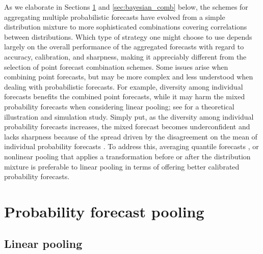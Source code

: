 \documentclass[11pt]{article}
\begin{document}
As we elaborate in Sections \ref{sec:pooling} and \ref{sec:bayesian_comb} below, the schemes for aggregating multiple probabilistic forecasts have evolved from a simple distribution mixture to more sophisticated combinations covering correlations between distributions. Which type of strategy one might choose to use depends largely on the overall performance of the aggregated forecasts with regard to accuracy, calibration, and sharpness, making it appreciably different from the selection of point forecast combination schemes. Some issues arise when combining point forecasts, but may be more complex and less understood when dealing with probabilistic forecasts. For example, diversity among individual forecasts benefits the combined point forecasts, while it may harm the mixed probability forecasts when considering linear pooling; see \citet{Ranjan2010-jl} for a theoretical illustration and simulation study. Simply put, as the diversity among individual probability forecasts increases, the mixed forecast becomes underconfident and lacks sharpness because of the spread driven by the disagreement on the mean of individual probability forecasts \citep{Hora2004-fz,Wallis2005-yf,Ranjan2010-jl}. To address this, averaging quantile forecasts \citep{Lichtendahl2013-rt}, or nonlinear pooling that applies a transformation before or after the distribution mixture \citep{Ranjan2010-jl,Gneiting2013-hl} is preferable to linear pooling in terms of offering better calibrated probability forecasts.


\section{Probability forecast pooling}
\label{sec:pooling}

\subsection{Linear pooling}
\label{sec:linear_pooling}
\end{document}
